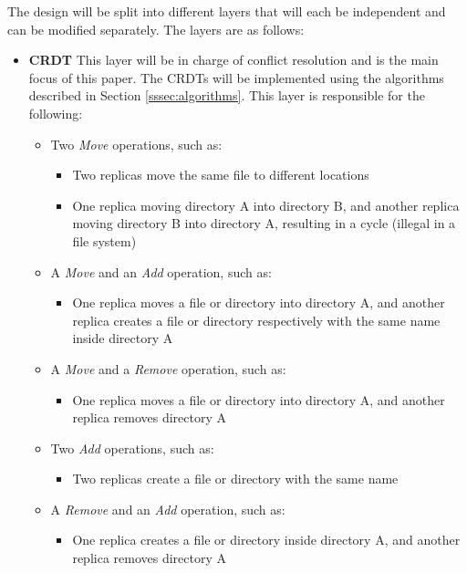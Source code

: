 \documentclass[12pt]{article}
\begin{document}
The design will be split into different layers that will each be independent and can be modified separately. The layers are as follows:
\begin{itemize}
    \item \textbf{CRDT} This layer will be in charge of conflict resolution and is the main focus of this paper. The CRDTs will be implemented using the algorithms described in Section \ref{sssec:algorithms}. This layer is responsible for the following: 
        \begin{itemize}
            \item  Two \textit{Move} operations, such as:
            \begin {itemize}
                \item Two replicas move the same file to different locations
                \item One replica moving directory A into directory B, and another replica moving directory B into directory A, resulting in a cycle (illegal in a file system)
            \end{itemize}
            \item  A \textit{Move} and an \textit{Add} operation, such as:
            \begin {itemize}
                \item One replica moves a file or directory into directory A, and another replica creates a file or directory respectively with the same name inside directory A
            \end{itemize}
            \item  A \textit{Move} and a \textit{Remove} operation, such as:
            \begin{itemize}
                \item One replica moves a file or directory into directory A, and another replica removes directory A
            \end{itemize}
            \item  Two \textit{Add} operations, such as:
            \begin{itemize}
                \item Two replicas create a file or directory with the same name
            \end{itemize}
            \item A \textit{Remove} and an \textit{Add} operation, such as:
            \begin{itemize}
                \item One replica creates a file or directory inside directory A, and another replica removes directory A
            \end{itemize}
        \end{itemize}


\end{itemize}
\end{document}
